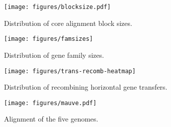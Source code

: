 \documentclass[english]{article}
\begin{document}
\begin{figure}
\begin{center}
\texttt{[image: figures/blocksize.pdf]}
\end{center}
\vspace{-.3in}
\caption{Distribution of core alignment block sizes.}
\label{fig:blocksize}
\end{figure}
\clearpage{}%

\begin{figure}
\begin{center}
\texttt{[image: figures/famsizes]}
\end{center}
\vspace{-.3in}
\caption{Distribution of gene family sizes.}
\label{fig:famsize}
\end{figure}

\clearpage


\begin{figure}
\begin{center}
\texttt{[image: figures/trans-recomb-heatmap]}
\end{center}
\vspace{-1.2in}
\caption{Distribution of recombining horizontal gene transfers.}
\label{fig:mowgli-recomb-heatmap}
\end{figure}

\begin{figure}
\begin{center}
\texttt{[image: figures/mauve.pdf]}
\end{center}
\vspace{-1.2in}
\caption{Alignment of the five genomes.}
\label{fig:mauve}
\end{figure}
\end{document}
